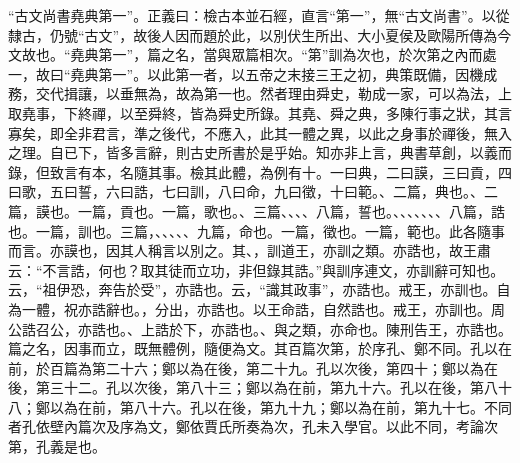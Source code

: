  {\noindent\shu{}\fzkt “古文尚書堯典第一”。正義曰：檢古本並石經，直言“第一”，無“古文尚書”。以從隸古，仍號“古文”，故後人因而題於此，以別伏生所出、大小夏侯及歐陽所傳為今文故也。“堯典第一”，篇之名，當與眾篇相次。“第”訓為次也，於次第之內而處一，故曰“堯典第一”。以此第一者，以五帝之末接三王之初，典策既備，因機成務，交代揖讓，以垂無為，故為第一也。然者理由舜史，勒成一家，可以為法，上取堯事，下終禪，以至舜終，皆為舜史所錄。其堯、舜之典，多陳行事之狀，其言寡矣，即全非君言，準之後代，不應入，此其一體之異，以此之身事於禪後，無入之理。自已下，皆多言辭，則古史所書於是乎始。知亦非上言，典書草創，以義而錄，但致言有本，名隨其事。檢其此體，為例有十。一曰典，二曰謨，三曰貢，四曰歌，五曰誓，六曰誥，七曰訓，八曰命，九曰徵，十曰範。、二篇，典也。、二篇，謨也。一篇，貢也。一篇，歌也。、三篇、、、、八篇，誓也。、、、、、、、八篇，誥也。一篇，訓也。三篇，、、、、、九篇，命也。一篇，徵也。一篇，範也。此各隨事而言。亦謨也，因其人稱言以別之。其、，訓道王，亦訓之類。亦誥也，故王肅云：“不言誥，何也？取其徒而立功，非但錄其誥。”與訓序連文，亦訓辭可知也。云，“祖伊恐，奔告於受”，亦誥也。云，“識其政事”，亦誥也。戒王，亦訓也。自為一體，祝亦誥辭也。，分出，亦誥也。以王命誥，自然誥也。戒王，亦訓也。周公誥召公，亦誥也。、上誥於下，亦誥也。、與之類，亦命也。陳刑告王，亦誥也。篇之名，因事而立，既無體例，隨便為文。其百篇次第，於序孔、鄭不同。孔以在前，於百篇為第二十六；鄭以為在後，第二十九。孔以次後，第四十；鄭以為在後，第三十二。孔以次後，第八十三；鄭以為在前，第九十六。孔以在後，第八十八；鄭以為在前，第八十六。孔以在後，第九十九；鄭以為在前，第九十七。不同者孔依壁內篇次及序為文，鄭依賈氏所奏為次，孔未入學官。以此不同，考論次第，孔義是也。 \par}

